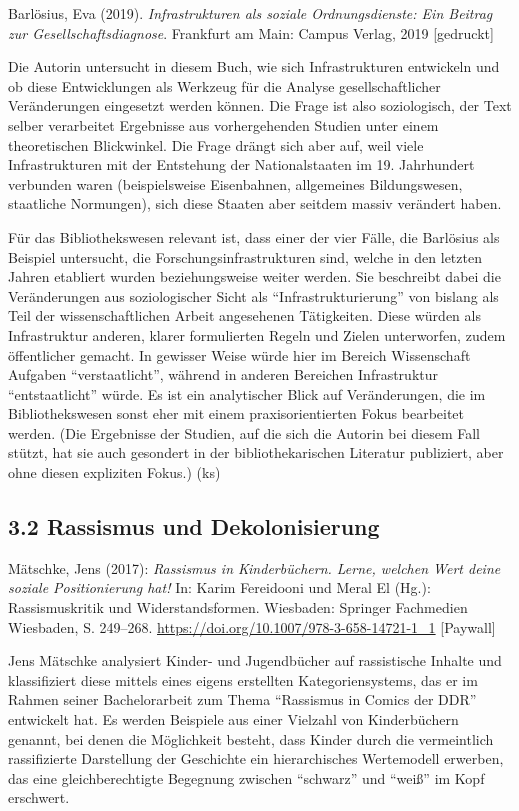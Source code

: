 \documentclass[a4paper,
fontsize=11pt,
oneside,
numbers=noperiodatend,
parskip=half-,
bibliography=totoc,
final
]{scrartcl}
\begin{document}
Barlösius, Eva (2019). \emph{Infrastrukturen als soziale
Ordnungsdienste: Ein Beitrag zur Gesellschaftsdiagnose}. Frankfurt am
Main: Campus Verlag, 2019 {[}gedruckt{]}

Die Autorin untersucht in diesem Buch, wie sich Infrastrukturen
entwickeln und ob diese Entwicklungen als Werkzeug für die Analyse
gesellschaftlicher Veränderungen eingesetzt werden können. Die Frage ist
also soziologisch, der Text selber verarbeitet Ergebnisse aus
vorhergehenden Studien unter einem theoretischen Blickwinkel. Die Frage
drängt sich aber auf, weil viele Infrastrukturen mit der Entstehung der
Nationalstaaten im 19. Jahrhundert verbunden waren (beispielsweise
Eisenbahnen, allgemeines Bildungswesen, staatliche Normungen), sich
diese Staaten aber seitdem massiv verändert haben.

Für das Bibliothekswesen relevant ist, dass einer der vier Fälle, die
Barlösius als Beispiel untersucht, die Forschungsinfrastrukturen sind,
welche in den letzten Jahren etabliert wurden beziehungsweise weiter
werden. Sie beschreibt dabei die Veränderungen aus soziologischer Sicht
als \enquote{Infrastrukturierung} von bislang als Teil der
wissenschaftlichen Arbeit angesehenen Tätigkeiten. Diese würden als
Infrastruktur anderen, klarer formulierten Regeln und Zielen
unterworfen, zudem öffentlicher gemacht. In gewisser Weise würde hier im
Bereich Wissenschaft Aufgaben \enquote{verstaatlicht}, während in
anderen Bereichen Infrastruktur \enquote{entstaatlicht} würde. Es ist
ein analytischer Blick auf Veränderungen, die im Bibliothekswesen sonst
eher mit einem praxisorientierten Fokus bearbeitet werden. (Die
Ergebnisse der Studien, auf die sich die Autorin bei diesem Fall stützt,
hat sie auch gesondert in der bibliothekarischen Literatur publiziert,
aber ohne diesen expliziten Fokus.) (ks)

\hypertarget{rassismus-und-dekolonisierung}{%
\subsection{3.2 Rassismus und
Dekolonisierung}\label{rassismus-und-dekolonisierung}}

Mätschke, Jens (2017): \emph{Rassismus in Kinderbüchern. Lerne, welchen
Wert deine soziale Positionierung hat!} In: Karim Fereidooni und Meral
El (Hg.): Rassismuskritik und Widerstandsformen. Wiesbaden: Springer
Fachmedien Wiesbaden, S. 249--268.
\url{https://doi.org/10.1007/978-3-658-14721-1_1} {[}Paywall{]}

Jens Mätschke analysiert Kinder- und Jugendbücher auf rassistische
Inhalte und klassifiziert diese mittels eines eigens erstellten
Kategoriensystems, das er im Rahmen seiner Bachelorarbeit zum Thema
\enquote{Rassismus in Comics der DDR} entwickelt hat. Es werden
Beispiele aus einer Vielzahl von Kinderbüchern genannt, bei denen die
Möglichkeit besteht, dass Kinder durch die vermeintlich rassifizierte
Darstellung der Geschichte ein hierarchisches Wertemodell erwerben, das
eine gleichberechtigte Begegnung zwischen \enquote{schwarz} und
\enquote{weiß} im Kopf erschwert.
\end{document}
